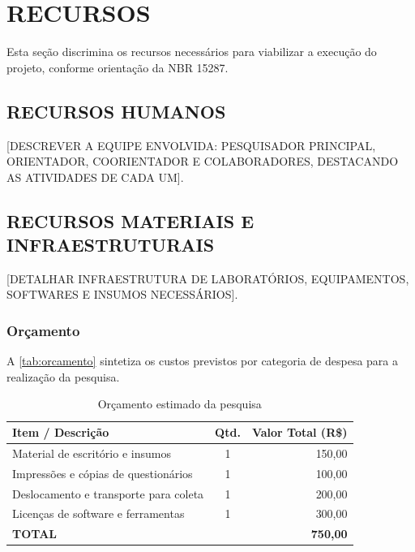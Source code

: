 \documentclass[
    12pt,        %
    openany,     %
    oneside,     %
    a4paper,     %
    english,     %
    brazil,      %
    article      %
]{abntex2}
\begin{document}
\section{RECURSOS}
\label{sec:recursos}

Esta seção discrimina os recursos necessários para viabilizar a execução do projeto, conforme orientação da NBR 15287.

\subsection{RECURSOS HUMANOS}
\label{subsec:recursos-humanos}

[DESCREVER A EQUIPE ENVOLVIDA: PESQUISADOR PRINCIPAL, ORIENTADOR, COORIENTADOR E COLABORADORES, DESTACANDO AS ATIVIDADES DE CADA UM].

\subsection{RECURSOS MATERIAIS E INFRAESTRUTURAIS}
\label{subsec:recursos-materiais}

[DETALHAR INFRAESTRUTURA DE LABORATÓRIOS, EQUIPAMENTOS, SOFTWARES E INSUMOS NECESSÁRIOS].

\subsubsection{Orçamento}
\label{subsubsec:orcamento}

A \autoref{tab:orcamento} sintetiza os custos previstos por categoria de despesa para a realização da pesquisa.

\begin{table}[htbp]
    \centering
    \caption{Orçamento estimado da pesquisa}
    \label{tab:orcamento}
    \begin{tabularx}{0.85\textwidth}{Xcr}
        \toprule
        \textbf{Item / Descrição} & \textbf{Qtd.} & \textbf{Valor Total (R\$)} \\
        \midrule
        Material de escritório e insumos & 1 & 150,00 \\
        Impressões e cópias de questionários & 1 & 100,00 \\
        Deslocamento e transporte para coleta & 1 & 200,00 \\
        Licenças de software e ferramentas & 1 & 300,00 \\
        \midrule
        \textbf{TOTAL} & & \textbf{750,00} \\
        \bottomrule
    \end{tabularx}
\end{table}
\end{document}
